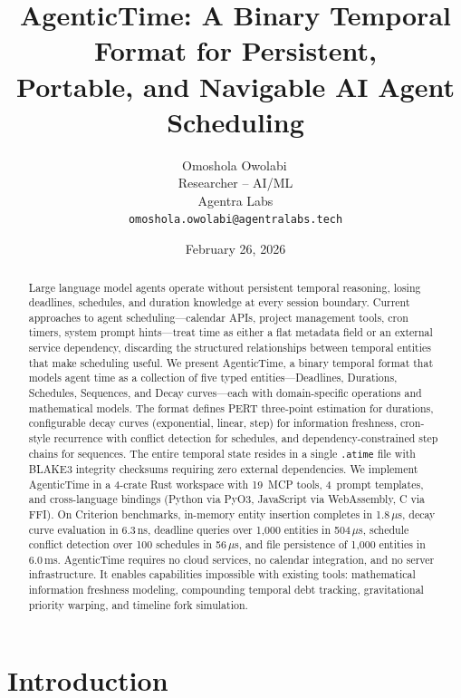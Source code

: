 \documentclass[10pt, twocolumn]{article}
\title{\textbf{AgenticTime: A Binary Temporal Format for Persistent,\\Portable, and Navigable AI Agent Scheduling}}
\author{Omoshola Owolabi\,\orcidlink{0009-0006-4089-0732}\\Researcher -- AI/ML\\Agentra Labs\\\texttt{omoshola.owolabi@agentralabs.tech}}
\date{February 26, 2026}
\begin{document}
\maketitle
\thispagestyle{fancy}

\begin{abstract}
Large language model agents operate without persistent temporal reasoning, losing deadlines, schedules, and duration knowledge at every session boundary. Current approaches to agent scheduling---calendar APIs, project management tools, cron timers, system prompt hints---treat time as either a flat metadata field or an external service dependency, discarding the structured relationships between temporal entities that make scheduling useful. We present AgenticTime, a binary temporal format that models agent time as a collection of five typed entities---Deadlines, Durations, Schedules, Sequences, and Decay curves---each with domain-specific operations and mathematical models. The format defines PERT three-point estimation for durations, configurable decay curves (exponential, linear, step) for information freshness, cron-style recurrence with conflict detection for schedules, and dependency-constrained step chains for sequences. The entire temporal state resides in a single \texttt{.atime} file with BLAKE3 integrity checksums requiring zero external dependencies. We implement AgenticTime in a 4-crate Rust workspace with 19~MCP tools, 4~prompt templates, and cross-language bindings (Python via PyO3, JavaScript via WebAssembly, C via FFI). On Criterion benchmarks, in-memory entity insertion completes in 1.8\,$\mu$s, decay curve evaluation in 6.3\,ns, deadline queries over 1{,}000 entities in 504\,$\mu$s, schedule conflict detection over 100 schedules in 56\,$\mu$s, and file persistence of 1{,}000 entities in 6.0\,ms. AgenticTime requires no cloud services, no calendar integration, and no server infrastructure. It enables capabilities impossible with existing tools: mathematical information freshness modeling, compounding temporal debt tracking, gravitational priority warping, and timeline fork simulation.
\end{abstract}

\section{Introduction}
\label{sec:intro}
\end{document}
